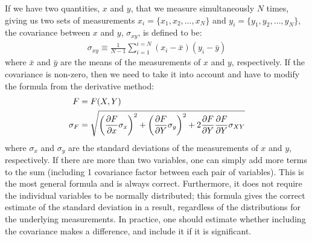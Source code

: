 If we have two quantities, $x$ and $y$, that we measure simultaneously $N$ times, giving us two sets of measurements  $x_i=\{x_1, x_2,\dots, x_N\}$ and $y_i=\{y_1, y_2,\dots, y_N\}$, the covariance between $x$ and $y$, $\sigma_{xy}$, is defined to be:
\begin{align}
\sigma_{xy}\equiv\frac{1}{N-1}\sum_{i=1}^{i=N}(x_i-\bar x)(y_i-\bar y)
\end{align}
where $\bar x$ and $\bar y$ are the means of the measurements of $x$ and $y$, respectively. If the covariance is non-zero, then we need to take it into account and have to modify the formula from the derivative method:
\begin{align}
F&=F(X,Y)\nonumber\\
\sigma_{F} &= \sqrt{\left(\frac{\partial F}{\partial x}\sigma_x\right)^2 + \left(\frac{\partial F}{\partial Y} \sigma_y\right)^2+2\frac{\partial F}{\partial Y}\frac{\partial F}{\partial Y}\sigma_{XY}}
\end{align}
where $\sigma_x$ and $\sigma_y$ are the standard deviations of the measurements of $x$ and $y$, respectively. If there are more than two variables, one can simply add more terms to the sum (including 1 covariance factor between each pair of variables). This is the most general formula and is always correct. Furthermore, it does not require the individual variables to be normally distributed; this formula gives the correct estimate of the standard deviation in a result, regardless of the distributions for the underlying measurements. In practice, one should estimate whether including the covariance makes a difference, and include it if it is significant.
